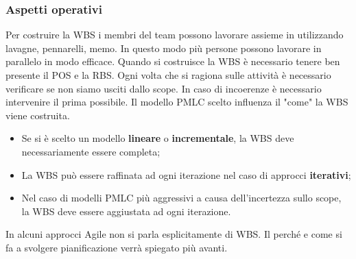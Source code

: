 \subsubsection{Aspetti operativi}
Per costruire la WBS i membri del team possono lavorare assieme in utilizzando lavagne, pennarelli, memo. In questo modo più persone possono lavorare in parallelo in modo efficace.
Quando si costruisce la WBS è necessario tenere ben presente il POS e la RBS. Ogni volta che si ragiona sulle attività è necessario verificare se non siamo usciti dallo scope. In caso di incoerenze è necessario intervenire il prima possibile.\newline
Il modello PMLC scelto influenza il "come" la WBS viene costruita.
\begin{itemize}
	\item Se si è scelto un modello \textbf{lineare} o \textbf{incrementale}, la WBS deve necessariamente essere completa;
	\item La WBS può essere raffinata ad ogni iterazione nel caso di approcci \textbf{iterativi};
	\item Nel caso di modelli PMLC più aggressivi a causa dell'incertezza sullo scope, la WBS deve essere aggiustata ad ogni iterazione.
\end{itemize}
\begin{warn}
	In alcuni approcci Agile non si parla esplicitamente di WBS. Il perché e come si fa a svolgere pianificazione verrà spiegato più avanti.
\end{warn}


